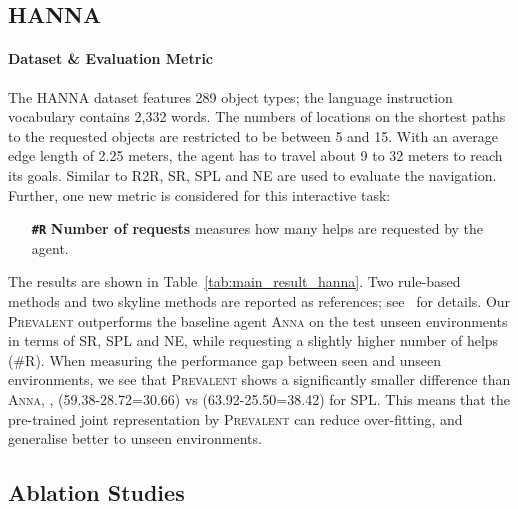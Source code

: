 \documentclass[10pt,twocolumn,letterpaper]{article}
\newcommand{\short}{\textsc{Prevalent}}
\begin{document}
\subsection{HANNA}

\paragraph{Dataset \& Evaluation Metric} The HANNA dataset features 289 object types; the language instruction vocabulary contains 2,332 words. The numbers of locations on the shortest paths to the requested objects are restricted to be between 5 and 15. With an average edge length of 2.25 meters, the agent has to travel about 9 to 32 meters to reach its goals. Similar to R2R, SR, SPL and NE are used to evaluate the navigation. Further, one new metric is considered for this interactive task:
\begin{itemize}[noitemsep,topsep=2pt] \item[\textbf{\texttt{\#R}}] \textbf{Number of requests} measures how many helps are requested by the agent. \end{itemize}

The results are shown in Table~\ref{tab:main_result_hanna}. Two rule-based methods and two skyline methods are reported as references; see~\cite{nguyen2019help} for details.
Our \short{} outperforms the baseline agent \textsc{Anna} on the test unseen environments in terms of SR, SPL and NE, while requesting a slightly higher number of helps (\#R). When measuring the performance gap between seen and unseen environments, we see that \short{} shows a significantly smaller difference than \textsc{Anna}, \eg, (59.38-28.72=30.66) vs (63.92-25.50=38.42) for SPL. This means that the pre-trained joint representation by \short{} can reduce over-fitting, and generalise better to unseen environments.






\subsection{Ablation Studies}
\end{document}
